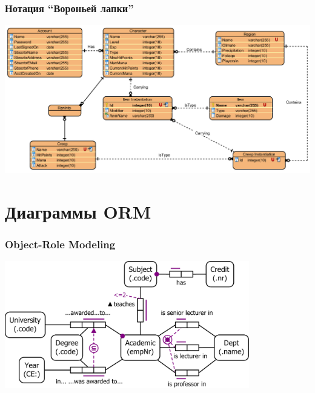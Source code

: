\documentclass{../../slides-style}
\begin{document}
    \begin{frame}
        \frametitle{Нотация ``Вороньей лапки''}
        \begin{center}
            \includegraphics[width=\textwidth]{erCrowsFoot.png}
        \end{center}
    \end{frame}

    \section{Диаграммы ORM}
    
    \begin{frame}
        \frametitle{Object-Role Modeling}
        \begin{center}
            \includegraphics[width=0.8\textwidth]{orm.png}
        \end{center}
    \end{frame}
\end{document}
